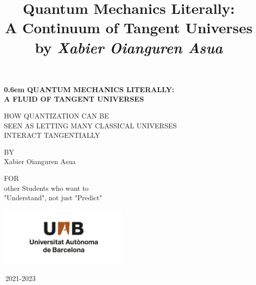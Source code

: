 \documentclass[11pt, a4paper]{article} %
\title{\vspace{-2cm} {\bf Quantum Mechanics Literally:\\ A Continuum of Tangent Universes}\\{\small by {\em Xabier Oianguren Asua}}\vspace{-0.8cm}}
\date{\vspace{-11ex}}
\begin{document}
\clearpage
\newcommand\nbvspace[1][3]{\vspace*{\stretch{#1}}}
\newcommand\nbstretchyspace{\spaceskip0.5em plus 0.25em minus 0.25em}
\newcommand{\nbtitlestretch}{\spaceskip0.6em}
\pagestyle{empty}
\begin{center}
\bfseries
\nbvspace[1]
\Huge
{\nbtitlestretch\huge
QUANTUM MECHANICS LITERALLY:\\
A FLUID OF TANGENT UNIVERSES
}

\nbvspace[1]
\normalsize

HOW QUANTIZATION CAN BE\\
SEEN AS LETTING MANY CLASSICAL UNIVERSES\\
INTERACT TANGENTIALLY

\nbvspace[1]


\nbvspace[1]
\small BY\\
\Large Xabier Oianguren Asua\\[0.5em]
\nbvspace[2]

\small FOR \\
\normalsize
other Students who want to\\
"Understand", not just "Predict"

\nbvspace[4]

\includegraphics[width=2.5in]{UAB.png}
\normalsize
\vspace{-0.5cm}

\large
\small
\small
$\ $2021-2023
\nbvspace[1]
\end{center}
\newpage
\null
\clearpage
\end{document}

